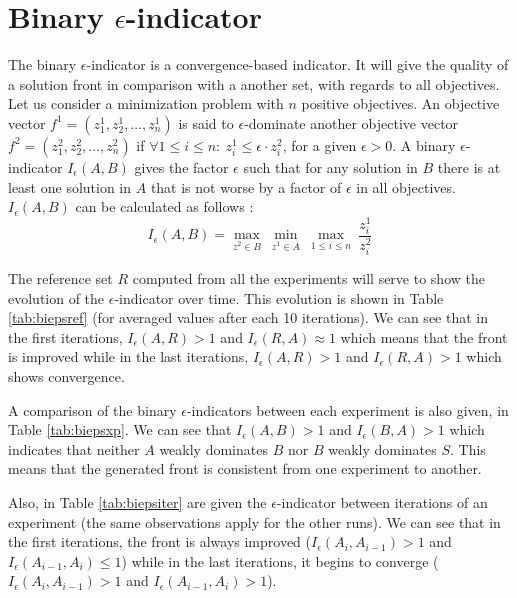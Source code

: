 \section{Binary $\epsilon$-indicator}
The binary $\epsilon$-indicator is a convergence-based indicator. It will give the quality of a solution front in comparison with a another set, with regards to all objectives. Let us consider a minimization problem with $n$ positive objectives. An objective vector $f^1 = (z_1^1, z_2^1, \dots, z_n^1)$ is said to $\epsilon$-dominate another objective vector $f^2 = (z_1^2, z_2^2, \dots, z_n^2)$ if $\forall 1 \leq i \leq n : \: z_i^1 \leq \epsilon \cdot z_i^2$, for a given $\epsilon > 0$. A binary $\epsilon$-indicator $I_\epsilon(A,B)$ gives the factor $\epsilon$ such that for any solution in $B$ there is at least one solution in $A$ that is not worse by a factor of $\epsilon$ in all objectives. $I_\epsilon(A,B)$ can be calculated as follows \cite{1197687}:
\begin{equation}
I_\epsilon(A,B) = \max\limits_{z^2 \in B} \: \min_{z^1 \in A} \: \max_{1 \leq i \leq n} \: \frac{z_i^1}{z_i^2}
\end{equation}

The reference set $R$ computed from all the experiments will serve to show the evolution of the $\epsilon$-indicator over time. This evolution is shown in Table \ref{tab:biepsref} (for averaged values after each 10 iterations). We can see that in the first iterations, $I_\epsilon(A,R) > 1$ and $I_\epsilon(R,A) \approx 1$ which means that the front is improved while in the last iterations, $I_\epsilon(A,R) > 1$ and $I_\epsilon(R,A) > 1$ which shows convergence.

A comparison of the binary $\epsilon$-indicators between each experiment is also given, in Table \ref{tab:biepsxp}. We can see that $I_\epsilon(A,B) > 1$ and $I_\epsilon(B,A) > 1$ which indicates that neither $A$ weakly dominates $B$ nor $B$ weakly dominates $S$. This means that the generated front is consistent from one experiment to another.

Also, in Table \ref{tab:biepsiter} are given the $\epsilon$-indicator between iterations of an experiment (the same observations apply for the other runs). We can see that in the first iterations, the front is always improved ($I_\epsilon(A_i, A_{i-1}) > 1$ and $I_\epsilon(A_{i-1}, A_i) \leq 1$) while in the last iterations, it begins to converge ($I_\epsilon(A_i, A_{i-1}) > 1$ and $I_\epsilon(A_{i-1}, A_i) > 1$).

